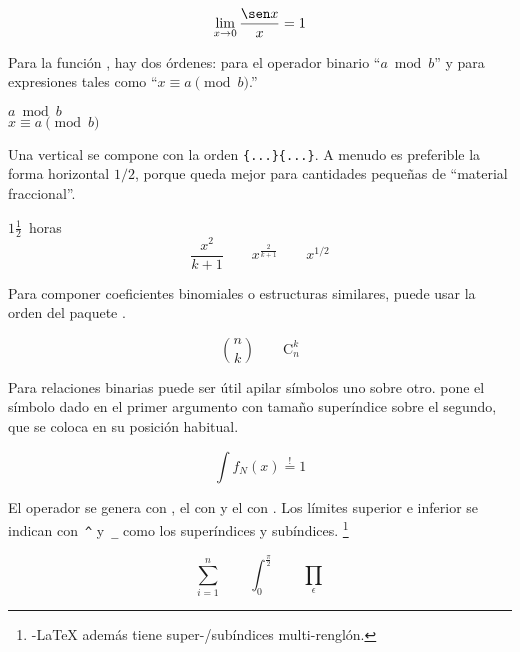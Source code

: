 \begin{example}
\[\lim_{x \rightarrow 0}
\frac{\sen x}{x}=1\]
\end{example}

Para la función , hay dos órdenes:  para el operador binario ``$a \bmod b$'' y  para expresiones tales como ``$x\equiv a \pmod{b}$.''
\begin{example}
$a\bmod b$\\
$x\equiv a \pmod{b}$
\end{example}

Una \textbf{} vertical se compone con la orden \verb|{...}{...}|.  A menudo es preferible la forma horizontal $1/2$, porque queda mejor para cantidades pequeñas de ``material fraccional''.
\begin{example}
$1\frac{1}{2}$~horas
\begin{displaymath}
\frac{ x^{2} }{ k+1 }\qquad
x^{ \frac{2}{k+1} }\qquad
x^{ 1/2 }
\end{displaymath}
\end{example}

Para componer coeficientes binomiales o estructuras similares, puede usar la orden  del paquete .

\begin{example}
\begin{displaymath}
\binom{n}{k}\qquad\mathrm{C}_n^k
\end{displaymath}
\end{example}

Para relaciones binarias puede ser útil apilar símbolos uno sobre otro.   pone el símbolo dado en el primer argumento con tamaño superíndice sobre el segundo, que se coloca en su posición habitual.
\begin{example}
\begin{displaymath}
\int f_N(x) \stackrel{!}{=} 1
\end{displaymath}
\end{example}

El operador \textbf{} se genera con , el \textbf{} con  y el \textbf{} con .  Los límites superior e inferior se indican con~\verb|^| y~\verb|_| como los superíndices y subíndices. \footnote{\AmS-\LaTeX{} además tiene super-/subíndices multi-renglón.}
\begin{example}
\begin{displaymath}
\sum_{i=1}^{n} \qquad
\int_{0}^{\frac{\pi}{2}} \qquad
\prod_\epsilon
\end{displaymath}
\end{example}

